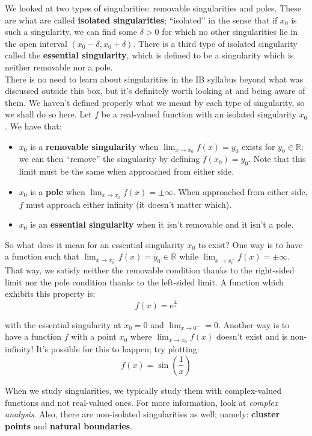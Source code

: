 \documentclass[12pt, a4paper, titlepage, twoside]{article}
\newcommand*{\R}{\mathbb{R}}
\newcommand*{\e}{\textrm{e}}
\begin{document}
	\hfill
	
	\begin{fr}
		We looked at two types of singularities: removable singularities and poles. These are what are called \textbf{isolated singularities};
		``isolated'' in the sense that if $x_0$ is such a singularity, we can find some $\delta > 0$ for which no other singularities lie in the
		open interval $(x_0-\delta, x_0+\delta)$. There is a third type of isolated singularity called the \textbf{essential singularity}, which is
		defined to be a singularity which is neither removable nor a pole.\\
		
		There is no need to learn about singularities in the IB syllabus beyond what was discussed outside this box, but it's definitely worth 
		looking at and being aware of them. We haven't defined properly what we meant by each type of singularity, so we shall do so here.
		Let $f$ be a real-valued function with an isolated singularity $x_0$. We have that:
		
		\begin{itemize}
			\item $x_0$ is a \textbf{removable singularity} when $\displaystyle \lim_{x \to x_0} f(x) = y_0$ exists for $y_0 \in \R$; we can then
			``remove'' the singularity by defining $f(x_0) = y_0$. Note that this limit must be the same when approached from either side.
			\item $x_0$ is a \textbf{pole} when $\displaystyle \lim_{x \to x_0} f(x) = \pm \infty$. When approached from either side, $f$ must
			approach either infinity (it doesn't matter which).
			\item $x_0$ is an \textbf{essential singularity} when it isn't removable and it isn't a pole.
		\end{itemize}
		
		So what does it mean for an essential singularity $x_0$ to exist? One way is to have a function such that $\displaystyle \lim_{x \to x_0^-} f(x)
		= y_0 \in \R$ while $\displaystyle \lim_{x \to x_0^+} f(x) = \pm \infty$. That way, we satisfy neither the removable condition thanks to the
		right-sided limit nor the pole condition thanks to the left-sided limit. A function which exhibits this property is:
		\[ f(x) = \e^{\tfrac{1}{x}} \]
		
		with the essential singularity at $x_0 = 0$ and $\displaystyle \lim_{x \to 0^-} = 0$. Another way is to have a function $f$ with a point
		$x_0$ where $\displaystyle \lim_{x \to x_0} f(x)$ doesn't exist and is non-infinity! It's possible for this to happen; try plotting:
		\[ f(x) = \sin\left(\frac{1}{x}\right) \]
		
		When we study singularities, we typically study them with complex-valued functions and not real-valued ones. For more information,
		look at \textit{complex analysis}. Also, there are non-isolated singularities as well; namely: \textbf{cluster points} and \textbf{natural
		boundaries}.
	\end{fr}
	
\end{document}
